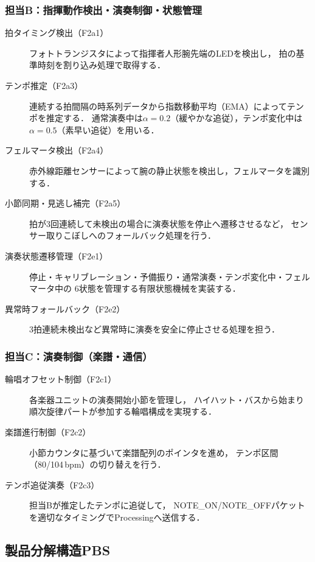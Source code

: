 \subsubsection*{担当B：指揮動作検出・演奏制御・状態管理}
\begin{description}
  \item[拍タイミング検出（F2a1）]
    フォトトランジスタによって指揮者人形腕先端のLEDを検出し，
    拍の基準時刻を割り込み処理で取得する．
  \item[テンポ推定（F2a3）]
    連続する拍間隔の時系列データから指数移動平均（EMA）によってテンポを推定する．
    通常演奏中は$\alpha=0.2$（緩やかな追従），テンポ変化中は$\alpha=0.5$（素早い追従）を用いる．
  \item[フェルマータ検出（F2a4）]
    赤外線距離センサーによって腕の静止状態を検出し，フェルマータを識別する．
  \item[小節同期・見逃し補完（F2a5）]
    拍が3回連続して未検出の場合に演奏状態を停止へ遷移させるなど，
    センサー取りこぼしへのフォールバック処理を行う．
  \item[演奏状態遷移管理（F2e1）]
    停止・キャリブレーション・予備振り・通常演奏・テンポ変化中・フェルマータ中の
    6状態を管理する有限状態機械を実装する．
  \item[異常時フォールバック（F2e2）]
    3拍連続未検出など異常時に演奏を安全に停止させる処理を担う．
\end{description}

\subsubsection*{担当C：演奏制御（楽譜・通信）}
\begin{description}
  \item[輪唱オフセット制御（F2c1）]
    各楽器ユニットの演奏開始小節を管理し，
    ハイハット・バスから始まり順次旋律パートが参加する輪唱構成を実現する．
  \item[楽譜進行制御（F2c2）]
    小節カウンタに基づいて楽譜配列のポインタを進め，
    テンポ区間（80/104\,bpm）の切り替えを行う．
  \item[テンポ追従演奏（F2c3）]
    担当Bが推定したテンポに追従して，
    NOTE\_ON/NOTE\_OFFパケットを適切なタイミングでProcessingへ送信する．
\end{description}

\subsection{製品分解構造PBS}

